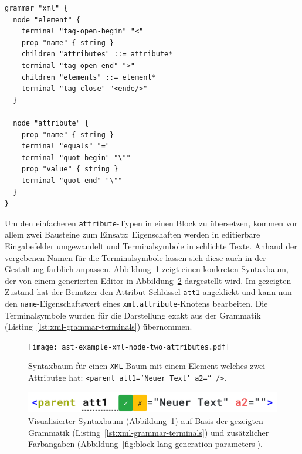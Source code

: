 \documentclass[paper=a4,fontsize=11pt,parskip=half]{scrartcl}
\begin{document}
\begin{lstlisting}[float=h, label={lst:xml-grammar-terminals},caption={Terminalsymbole für Attribute und Elemente in \texttt{XML} },captionpos=b,language={Grammar}]
grammar "xml" {
  node "element" {
    terminal "tag-open-begin" "<"
    prop "name" { string }
    children "attributes" ::= attribute*
    terminal "tag-open-end" ">"
    children "elements" ::= element*
    terminal "tag-close" "<ende/>"
  }

  node "attribute" {
    prop "name" { string }
    terminal "equals" "="
    terminal "quot-begin" "\""
    prop "value" { string }
    terminal "quot-end" "\""
  }
}
\end{lstlisting}

Um den einfacheren \texttt{attribute}-Typen in einen Block zu übersetzen, kommen vor allem zwei Bausteine zum Einsatz: Eigenschaften werden in editierbare Eingabefelder umgewandelt und Terminalsymbole in schlichte Texte. Anhand der vergebenen Namen für die Terminalsymbole lassen sich diese auch in der Gestaltung farblich anpassen. Abbildung~\ref{fig:ast-example-xml-node-two-attributes} zeigt einen konkreten Syntaxbaum, der von einem generierten Editor in Abbildung~\ref{fig:example-xml-generated} dargestellt wird. Im gezeigten Zustand hat der Benutzer den Attribut-Schlüssel \texttt{att1} angeklickt und kann nun den \texttt{name}-Eigenschaftswert eines \texttt{xml.attribute}-Knotens bearbeiten. Die Terminalsymbole wurden für die Darstellung exakt aus der Grammatik (Listing~\ref{lst:xml-grammar-terminals}) übernommen.

\begin{figure}[p]
  \centering\texttt{[image: ast-example-xml-node-two-attributes.pdf]}
  \caption{Syntaxbaum für einen \texttt{XML}-Baum mit einem Element welches zwei Attributge hat: \texttt{<parent att1='Neuer Text' a2='' />}.}
  \label{fig:ast-example-xml-node-two-attributes}
\end{figure}

\begin{figure}[p]
  \centering\includegraphics[width=\linewidth]{screenshot-generated-xml.png}
  \caption{Visualisierter Syntaxbaum (Abbildung~\ref{fig:ast-example-xml-node-two-attributes}) auf Basis der gezeigten Grammatik (Listing~\ref{lst:xml-grammar-terminals}) und zusätzlicher Farbangaben (Abbildung~\ref{fig:block-lang-generation-parameters}).}
  \label{fig:example-xml-generated}
\end{figure}
\end{document}
